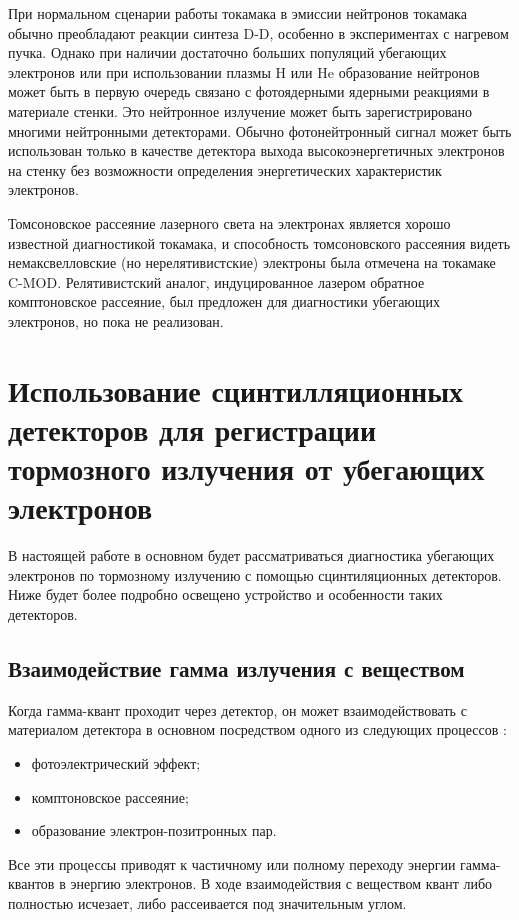 При нормальном сценарии работы токамака в эмиссии нейтронов токамака обычно преобладают реакции синтеза D-D, особенно в экспериментах с нагревом пучка. Однако при наличии достаточно больших популяций убегающих электронов или при использовании плазмы H или He образование нейтронов может быть в первую очередь связано с фотоядерными ядерными реакциями в материале стенки. Это нейтронное излучение может быть зарегистрировано многими нейтронными детекторами. Обычно фотонейтронный сигнал может быть использован только в качестве детектора выхода высокоэнергетичных электронов на стенку без возможности определения энергетических характеристик электронов.~\cite{Breizman2019,Strachan1977}

Томсоновское рассеяние лазерного света на электронах является хорошо известной диагностикой токамака, и способность томсоновского рассеяния видеть немаксвелловские (но нерелятивистские) электроны была отмечена на токамаке C-MOD. Релятивистский аналог, индуцированное лазером обратное комптоновское рассеяние, был предложен для диагностики убегающих электронов, но пока не реализован.~\cite{Breizman2019,Pieroni1975,Wurden2014}


\section{Использование сцинтилляционных детекторов для регистрации тормозного излучения от убегающих электронов}

В настоящей работе в основном будет рассматриваться диагностика убегающих электронов по тормозному излучению с помощью сцинтиляционных детекторов. Ниже будет более подробно освещено устройство и особенности таких детекторов.


\subsection{ Взаимодействие гамма излучения с веществом}

Когда гамма-квант проходит через детектор, он может взаимодействовать с материалом детектора в основном посредством одного из следующих процессов \cite{Grozdanov2021,Knoll2010}: 
\begin{itemize}
  \item фотоэлектрический эффект;
  \item комптоновское рассеяние;
  \item образование электрон-позитронных пар.  
\end{itemize}
Все эти процессы приводят к частичному или полному переходу энергии гамма-квантов в энергию электронов. В ходе взаимодействия с веществом квант либо полностью исчезает, либо рассеивается под значительным углом.~\cite{Knoll2010}

